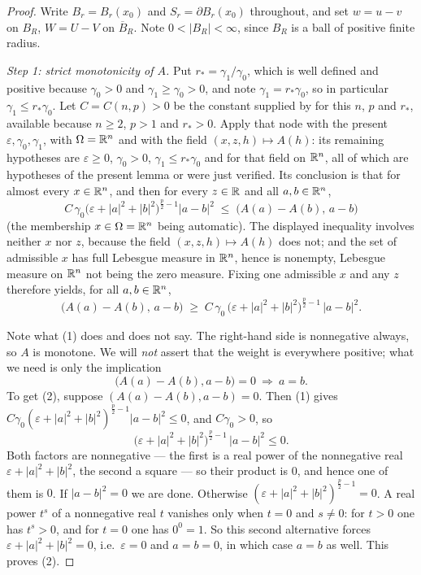 \begin{proof}
Write $B_r=B_r(x_0)$ and $S_r=\partial B_r(x_0)$ throughout, and set
$w=u-v$ on $B_R$, $W=U-V$ on $\overline B_R$.  Note $0<|B_R|<\infty$, since
$B_R$ is a ball of positive finite radius.

\emph{Step 1: strict monotonicity of $A$.}  Put $r_\ast=\gamma_1/\gamma_0$,
which is well defined and positive because $\gamma_0>0$ and
$\gamma_1\ge\gamma_0>0$, and note $\gamma_1=r_\ast\gamma_0$, so in particular
$\gamma_1\le r_\ast\gamma_0$.  Let $C=C(n,p)>0$ be the constant supplied by
 for this $n$, $p$ and $r_\ast$, available
because $n\ge2$, $p>1$ and $r_\ast>0$.  Apply that node with the present
$\varepsilon,\gamma_0,\gamma_1$, with $\Omega=\mathbb{R}^n$ and with the field
$(x,z,h)\mapsto A(h)$: its remaining hypotheses are $\varepsilon\ge0$,
$\gamma_0>0$, $\gamma_1\le r_\ast\gamma_0$ and
 for that field on $\mathbb{R}^n$, all of which are
hypotheses of the present lemma or were just verified.  Its conclusion is that
for almost every $x\in\mathbb{R}^n$, and then for every $z\in\mathbb{R}$ and all
$a,b\in\mathbb{R}^n$,
\[
C\,\gamma_0\bigl(\varepsilon+|a|^2+|b|^2\bigr)^{\frac p2-1}|a-b|^2
\;\le\;\bigl(A(a)-A(b),\,a-b\bigr)
\]
(the membership $x\in\Omega=\mathbb{R}^n$ being automatic).  The displayed inequality
involves neither $x$ nor $z$, because the field $(x,z,h)\mapsto A(h)$ does not;
and the set of admissible $x$ has full Lebesgue measure in $\mathbb{R}^n$, hence is
nonempty, Lebesgue measure on $\mathbb{R}^n$ not being the zero measure.  Fixing one
admissible $x$ and any $z$ therefore yields, for all $a,b\in\mathbb{R}^n$,
\[
\bigl(A(a)-A(b),\,a-b\bigr)
\;\ge\;C\,\gamma_0\,\bigl(\varepsilon+|a|^2+|b|^2\bigr)^{\frac p2-1}\,|a-b|^2 .
\tag{1}
\]

Note what (1) does and does not say.  The right-hand side is nonnegative
always, so $A$ is monotone.  We will \emph{not} assert that the weight is
everywhere positive; what we need is only the implication
\[
\bigl(A(a)-A(b),a-b\bigr)=0\ \Longrightarrow\ a=b .
\tag{2}
\]
To get (2), suppose $(A(a)-A(b),a-b)=0$.  Then (1) gives
$C\gamma_0(\varepsilon+|a|^2+|b|^2)^{\frac p2-1}|a-b|^2\le0$, and $C\gamma_0>0$,
so
\[
\bigl(\varepsilon+|a|^2+|b|^2\bigr)^{\frac p2-1}\,|a-b|^2\le0 .
\]
Both factors are nonnegative --- the first is a real power of the nonnegative
real $\varepsilon+|a|^2+|b|^2$, the second a square --- so their product is $0$,
and hence one of them is $0$.  If $|a-b|^2=0$ we are done.  Otherwise
$(\varepsilon+|a|^2+|b|^2)^{\frac p2-1}=0$.  A real power $t^{s}$ of a
nonnegative real $t$ vanishes only when $t=0$ and $s\ne0$: for $t>0$ one has
$t^{s}>0$, and for $t=0$ one has $0^{0}=1$.  So this second alternative forces
$\varepsilon+|a|^2+|b|^2=0$, i.e.\ $\varepsilon=0$ and $a=b=0$, in which case
$a=b$ as well.  This proves (2).


\end{proof}
